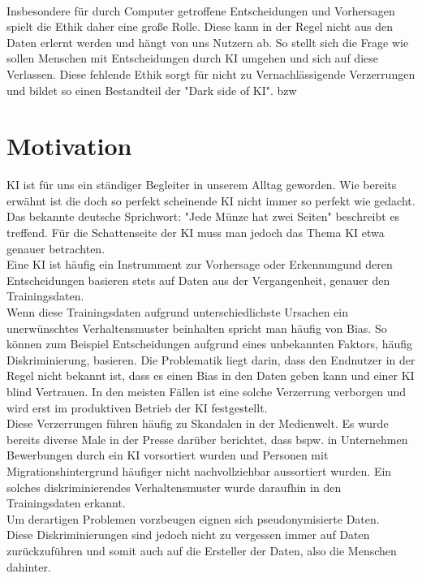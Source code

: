 \begin{onehalfspace}
        \\
        Insbesondere für durch Computer getroffene Entscheidungen und Vorhersagen spielt die Ethik daher eine große Rolle. Diese kann in der Regel nicht aus den Daten erlernt werden und hängt von uns Nutzern ab. So stellt sich die Frage wie sollen Menschen mit Entscheidungen durch \ac*{KI} umgehen und sich auf diese Verlassen. Diese fehlende Ethik sorgt für nicht zu Vernachlässigende Verzerrungen und bildet so einen Bestandteil der "Dark side of KI". \ac{bzw}

        \section{Motivation}
        \label{subsec:motivation}
        \ac*{KI} ist für uns ein ständiger Begleiter in unserem Alltag geworden. Wie bereits erwähnt ist die doch so perfekt scheinende \ac*{KI} nicht immer so perfekt wie gedacht. Das bekannte deutsche Sprichwort: "Jede Münze hat zwei Seiten" beschreibt es treffend. Für die Schattenseite der \ac*{KI} muss man jedoch das Thema \ac*{KI} etwa genauer betrachten.  
        \\
        Eine \ac*{KI} ist häufig ein Instrumment zur Vorhersage oder Erkennungund deren Entscheidungen basieren stets auf Daten aus der Vergangenheit, genauer den Trainingsdaten. 
        \\
        Wenn diese Trainingsdaten aufgrund unterschiedlichste Ursachen ein unerwünschtes Verhaltensmuster beinhalten spricht man häufig von Bias. So können zum Beispiel Entscheidungen aufgrund eines unbekannten Faktors, häufig Diskriminierung,  basieren. Die Problematik liegt darin, dass den Endnutzer in der Regel nicht bekannt ist, dass es einen Bias in den Daten geben kann und einer \ac*{KI} blind Vertrauen. In den meisten Fällen ist eine solche Verzerrung verborgen und wird erst im produktiven Betrieb der \ac*{KI} festgestellt.
        \\
        Diese Verzerrungen führen häufig zu Skandalen in der Medienwelt. Es wurde bereits diverse Male in der Presse darüber berichtet, dass bspw. in Unternehmen Bewerbungen durch ein \ac*{KI} vorsortiert wurden und Personen mit Migrationshintergrund häufiger nicht nachvollziehbar aussortiert wurden. Ein solches diskriminierendes Verhaltensmuster wurde daraufhin in den Trainingsdaten erkannt.
        \\
        Um derartigen Problemen vorzbeugen eignen sich pseudonymisierte Daten. 
        \\
        Diese Diskriminierungen sind jedoch nicht zu vergessen immer auf Daten zurückzuführen und somit auch auf die Ersteller der Daten, also die Menschen dahinter.


\end{onehalfspace}
